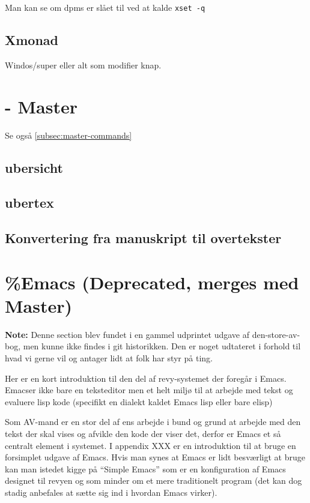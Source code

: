 \documentclass[10pt,a4paper,danish]{article}
\let\oldmarginnote\marginnote
\renewcommand{\marginnote}[1]{\oldmarginnote{\raggedright{}\footnotesize #1}}
\newcommand{\note}[1]{\begin{mdframed}[style=note]\textbf{Note:}
    #1\end{mdframed}}
\newcommand{\code}[1]{\colorbox{verbgray}{\texttt{#1}}}
\begin{document}
Man kan se om dpms er slået til ved at kalde \code{xset -q}
\subsection{Xmonad}
Windos/super eller alt som modifier knap.

\newpage
\section{- Master}
Se også \ref{subsec:master-commands}

\subsection{ubersicht}
\label{subsec:ubersicht}
\subsection{ubertex}
\label{subsec:ubertex}
\subsection{Konvertering fra manuskript til overtekster}
\label{subsec:konvertering-manus-overtekst}

\newpage
\section{\%Emacs (Deprecated, merges med Master)}
\note{Denne section blev fundet i en gammel udprintet udgave af
  den-store-av-bog, men kunne ikke findes i git historikken.
Den er noget udtateret i forhold til hvad vi gerne vil og antager lidt at folk
har styr på ting.}

Her er en kort introduktion til den del af revy-systemet der foregår i Emacs.
Emacser ikke bare en teksteditor men et helt miljø til at arbejde med tekst og
evaluere lisp kode (specifikt en dialekt kaldet Emacs lisp eller bare elisp)

Som AV-mand er en stor del af ens arbejde i bund og grund at arbejde med den
tekst der skal vises og afvikle den kode der viser det, derfor er Emacs et så
centralt element i systemet. I appendix XXX\marginnote{\note{Nej der er ej}} er en
introduktion til at bruge en forsimplet udgave af Emacs. Hvis man synes at Emacs
er lidt besværligt at bruge kan man istedet kigge på ``Simple Emacs'' som er en
konfiguration af Emacs designet til revyen og som minder om et mere traditionelt
program (det kan dog stadig anbefales at sætte sig ind i hvordan Emacs virker).
\end{document}
